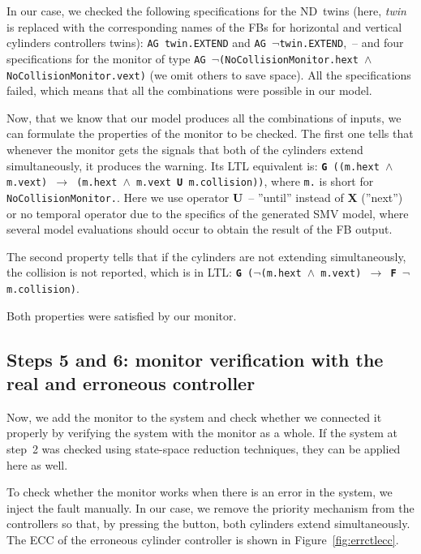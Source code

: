 \begin{bibunit}
In our case, we checked the following specifications for the ND~twins (here, \emph{twin} is replaced with the corresponding names of the FBs for horizontal and vertical cylinders controllers twins): \texttt{AG twin.EXTEND} and \texttt{AG $\neg$twin.EXTEND},~-- and four specifications for the monitor of type \texttt{AG $\neg$(NoCollisionMonitor.hext $\land$ NoCollisionMonitor.vext)} (we omit others to save space). All the specifications failed, which means that all the combinations were possible in our model. 

Now, that we know that our model produces all the combinations of inputs, we can formulate the properties of the monitor to be checked. The first one tells that whenever the monitor gets the signals that both of the cylinders extend simultaneously, it produces the warning. Its LTL equivalent is: \texttt{\textbf{G} ((m.hext $\land$ m.vext) $\rightarrow$ (m.hext $\land$ m.vext \textbf{U} m.collision))}, where \texttt{m.} is short for \texttt{NoCollisionMonitor.}. Here we use operator \textbf{U}~-- ''until'' instead of \textbf{X} (''next'') or no temporal operator due to the specifics of the generated SMV model, where several model evaluations should occur to obtain the result of the FB output.

The second property tells that if the cylinders are not extending simultaneously, the collision is not reported, which is in LTL: \texttt{\textbf{G} ($\neg$(m.hext $\land$ m.vext) $\rightarrow$ \textbf{F} $\neg$ m.collision)}.

Both properties were satisfied by our monitor.

\subsection{Steps 5 and 6: monitor verification with the real and erroneous controller}

Now, we add the monitor to the system and check whether we connected it properly by verifying the system with the monitor as a whole. If the system at step~2 was checked using state-space reduction techniques, they can be applied here as well.

To check whether the monitor works when there is an error in the system, we inject the fault manually. In our case, we remove the priority mechanism from the controllers so that, by pressing the button, both cylinders extend simultaneously. The ECC of the erroneous cylinder controller is shown in Figure~\ref{fig:errctlecc}.


\end{bibunit}
